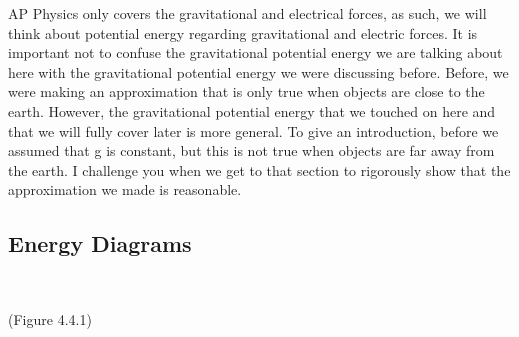 \documentclass{article}[gray]
\numberwithin{equation}{subsection}
\begin{document}
AP Physics only covers the gravitational and electrical forces, as such, we will think about potential energy regarding gravitational and electric forces. It is important not to confuse the gravitational potential energy we are talking about here with the gravitational potential energy we were discussing before. Before, we were making an approximation that is only true when objects are close to the earth. However, the gravitational potential energy that we touched on here and that we will fully cover later is more general. To give an introduction, before we assumed that g is constant, but this is not true when objects are far away from the earth. I challenge you when we get to that section to rigorously show that the approximation we made is reasonable.


\subsection{Energy Diagrams}
\
\newline
{}
\begin{center}
(Figure 4.4.1)
\end{center}
\end{document}
